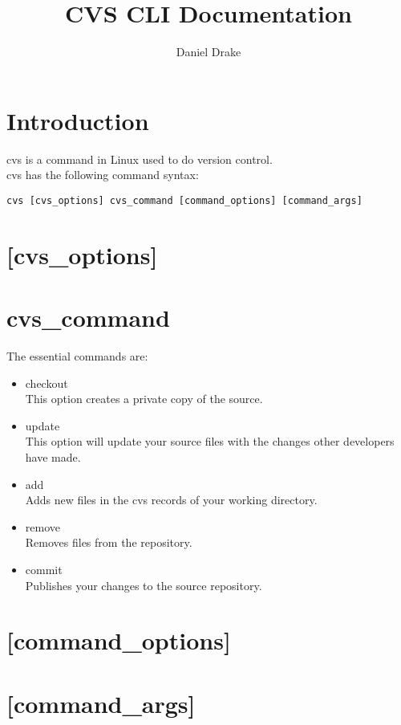 \documentclass[12pt]{extarticle}
\title{CVS CLI Documentation}
\author{Daniel Drake}
\theoremstyle{plain}
\theoremstyle{Definition}
\theoremstyle{Definition}
\theoremstyle{plain}
\begin{document}
	\maketitle
	\section{Introduction}
	cvs is a command in Linux used to do version control.  \\
	cvs has the following command syntax: 
	\begin{center}
		\verb|cvs [cvs_options] cvs_command [command_options] [command_args]|
	\end{center}

	\section{[cvs\_options]}

	\section{cvs\_command}
	The essential commands are: 
	\begin{itemize}
		\item checkout \\
		This option creates a private copy of the source. 
		\item update \\
		This option will update your source files with the changes other developers have made. 
		\item add \\
		Adds new files in the cvs records of your working directory. 
		\item remove \\
		Removes files from the repository. 
		\item commit \\
		Publishes your changes to the source repository. 
	\end{itemize}
	\section{[command\_options]}
	
	\section{[command\_args]}
	
\end{document}
